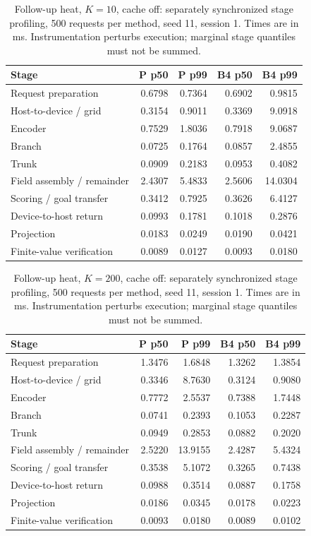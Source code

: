 \begin{table}[ht]
\centering\small
\caption{Follow-up heat, $K=10$, cache off: separately synchronized stage profiling, 500 requests per method, seed 11, session 1. Times are in ms. Instrumentation perturbs execution; marginal stage quantiles must not be summed.}\label{tab:e2_profile_heat_10_off}
\begin{tabular}{@{}lrrrr@{}}\toprule
Stage & P p50 & P p99 & B4 p50 & B4 p99\\\midrule
Request preparation & 0.6798 & 0.7364 & 0.6902 & 0.9815\\
Host-to-device / grid & 0.3154 & 0.9011 & 0.3369 & 9.0918\\
Encoder & 0.7529 & 1.8036 & 0.7918 & 9.0687\\
Branch & 0.0725 & 0.1764 & 0.0857 & 2.4855\\
Trunk & 0.0909 & 0.2183 & 0.0953 & 0.4082\\
Field assembly / remainder & 2.4307 & 5.4833 & 2.5606 & 14.0304\\
Scoring / goal transfer & 0.3412 & 0.7925 & 0.3626 & 6.4127\\
Device-to-host return & 0.0993 & 0.1781 & 0.1018 & 0.2876\\
Projection & 0.0183 & 0.0249 & 0.0190 & 0.0421\\
Finite-value verification & 0.0089 & 0.0127 & 0.0093 & 0.0180\\
\bottomrule\end{tabular}
\end{table}

\begin{table}[ht]
\centering\small
\caption{Follow-up heat, $K=200$, cache off: separately synchronized stage profiling, 500 requests per method, seed 11, session 1. Times are in ms. Instrumentation perturbs execution; marginal stage quantiles must not be summed.}\label{tab:e2_profile_heat_200_off}
\begin{tabular}{@{}lrrrr@{}}\toprule
Stage & P p50 & P p99 & B4 p50 & B4 p99\\\midrule
Request preparation & 1.3476 & 1.6848 & 1.3262 & 1.3854\\
Host-to-device / grid & 0.3346 & 8.7630 & 0.3124 & 0.9080\\
Encoder & 0.7772 & 2.5537 & 0.7388 & 1.7448\\
Branch & 0.0741 & 0.2393 & 0.1053 & 0.2287\\
Trunk & 0.0949 & 0.2853 & 0.0882 & 0.2020\\
Field assembly / remainder & 2.5220 & 13.9155 & 2.4287 & 5.4324\\
Scoring / goal transfer & 0.3538 & 5.1072 & 0.3265 & 0.7438\\
Device-to-host return & 0.0988 & 0.3514 & 0.0887 & 0.1758\\
Projection & 0.0186 & 0.0345 & 0.0178 & 0.0223\\
Finite-value verification & 0.0093 & 0.0180 & 0.0089 & 0.0102\\
\bottomrule\end{tabular}
\end{table}

